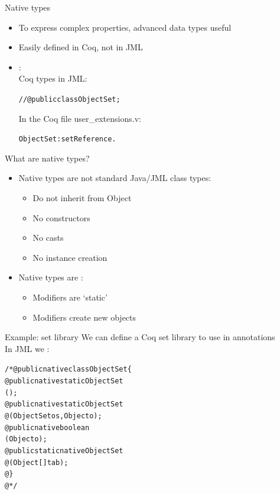 \documentclass[final,nocolorBG,a4,mobius,nototal,pdf,slideColor]{prosper}
\begin{document}
\begin{slide}{Native types}
\begin{itemize}
\item To express complex properties, advanced data types useful
\item Easily defined in Coq, not in JML
\item {}: \\
Coq types in JML: 
\begin{alltt}
//@  public  class ObjectSet; 
\end{alltt}
In the Coq file user\_extensions.v:
\begin{alltt}
   ObjectSet : set Reference.
\end{alltt}
\end{itemize}
\end{slide}

\begin{slide}{What are native types?}
\begin{itemize}
\item Native types are not standard Java/JML class types:
\begin{itemize}
\item Do not inherit from Object
\item No constructors
\item No casts
\item No instance creation
\end{itemize}
\item Native types are : 
\begin{itemize}
\item Modifiers are `static'
\item Modifiers create new objects 
\end{itemize}
\end{itemize}
\end{slide}

\begin{slide}{Example: set library}
We can define a Coq set library to use in annotations\\

In JML we :
\begin{alltt}
/*@ public native class ObjectSet \{
  @ public native static ObjectSet 
              ();
  @ public native static ObjectSet 
  @           (ObjectSet os, Object o);
  @ public native boolean 
              (Object o);
  @ public static native ObjectSet 
  @           (Object [] tab);
  @ \}
  @*/
\end{alltt}
\end{slide}
\end{document}
